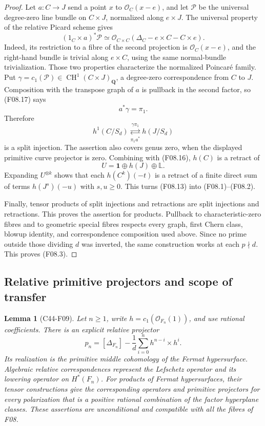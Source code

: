 \documentclass[11pt]{article}
\newtheorem{lemma}[theorem]{Lemma}
\theoremstyle{remark}\newtheorem{remark}[theorem]{Remark}
\begin{document}
\begin{proof}
Let $a:C\to J$ send a point $x$ to
$\mathcal O_C(x-e)$, and let $\mathcal P$ be the universal
degree-zero line bundle on $C\times J$, normalized along
$e\times J$. The universal property of the relative Picard
scheme gives
\[
 (1_C\times a)^*\mathcal P
  \simeq\mathcal O_{C\times C}
              (\Delta_C-e\times C-C\times e).
 \tag{F08.17}
\]
Indeed, its restriction to a fibre of the second projection is
$\mathcal O_C(x-e)$, and the right-hand bundle is trivial along
$e\times C$, using the same normal-bundle trivialization. Those
two properties characterize the normalized Poincar\'e family.
Put $\gamma=c_1(\mathcal P)\in
\operatorname{CH}^1(C\times J)_{\mathbf Q}$, a degree-zero
correspondence from $C$ to $J$. Composition with the transpose
graph of $a$ is pullback in the second factor, so (F08.17) says
\[
 a^*\gamma=\pi_1.
 \tag{F08.18}
\]
Therefore
\[
 h^1(C/S_d)
 \underset{\pi_1a^*}{\stackrel{\gamma\pi_1}{\rightleftarrows}}
 h(J/S_d)
\]
is a split injection. The assertion also covers genus zero, when
the displayed primitive curve projector is zero. Combining with
(F08.16), $h(C)$ is a retract of
\[
 U=\mathbf1\oplus h(J)\oplus\mathbb L.
 \tag{F08.19}
\]
Expanding $U^{\otimes k}$ shows that each $h(C^k)(-t)$ is a
retract of a finite direct sum of terms $h(J^s)(-u)$ with
$s,u\geq0$. This turns (F08.13) into (F08.1)--(F08.2).

Finally, tensor products of split injections and retractions are
split injections and retractions. This proves the assertion for
products. Pullback to characteristic-zero fibres and to geometric
special fibres respects every graph, first Chern class, blowup
identity, and correspondence composition used above. Since no
prime outside those dividing $d$ was inverted, the same
construction works at each $p\nmid d$. This proves (F08.3).
\end{proof}

\subsection{Relative primitive projectors and scope of transfer}

\begin{lemma}[C44-F09]\label{C44-F09}
Let $n\geq1$, write $h=c_1(\mathcal O_{F_n}(1))$, and use rational
coefficients.
There is an explicit relative projector
\[
 p_n=[\Delta_{F_n}]
       -\frac1d\sum_{i=0}^{n}h^{n-i}\times h^i.
 \tag{F09.1}
\]
Its realization is the primitive middle cohomology of the Fermat
hypersurface. Algebraic relative correspondences represent the
Lefschetz operator and its lowering operator on $H^*(F_n)$.
For products of Fermat hypersurfaces, their tensor constructions
give the corresponding operators and primitive projectors for
every polarization that is a positive rational combination of the
factor hyperplane classes. These assertions are
unconditional and compatible with all the fibres of F08.
\end{lemma}
\end{document}
